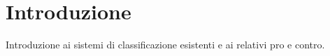 \chapter{Introduzione}\label{ch:classificazione:intro}
Introduzione ai sistemi di classificazione esistenti e ai relativi pro e contro.
